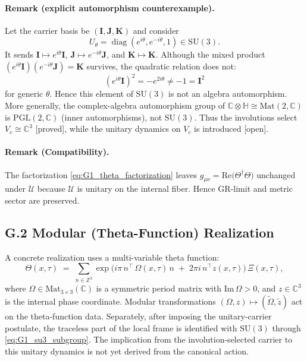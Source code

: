 \paragraph{Remark (explicit automorphism counterexample).}
Let the carrier basis be $(\mathbf{I},\mathbf{J},\mathbf{K})$ and consider
\[
U_\theta=\operatorname{diag}(e^{i\theta},e^{-i\theta},1)\in\mathrm{SU}(3).
\]
It sends $\mathbf{I}\mapsto e^{i\theta}\mathbf{I}$,
$\mathbf{J}\mapsto e^{-i\theta}\mathbf{J}$, and
$\mathbf{K}\mapsto\mathbf{K}$.  Although the mixed product
$(e^{i\theta}\mathbf{I})(e^{-i\theta}\mathbf{J})=\mathbf{K}$ survives,
the quadratic relation does not:
\[
(e^{i\theta}\mathbf{I})^2=-e^{2i\theta}\neq-1=\mathbf{I}^2
\]
for generic $\theta$.  Hence this element of $\mathrm{SU}(3)$ is not an
algebra automorphism.  More generally, the complex-algebra automorphism group
of $\mathbb{C}\otimes\mathbb{H}\cong\mathrm{Mat}(2,\mathbb{C})$ is
$\mathrm{PGL}(2,\mathbb{C})$ (inner automorphisms), not $\mathrm{SU}(3)$.
Thus the involutions select $V_c\cong\mathbb{C}^3$ [proved], while the unitary
dynamics on $V_c$ is introduced [open].

\paragraph{Remark (Compatibility).}
The factorization \eqref{eq:G1_theta_factorization} leaves 
$g_{\mu\nu}=\mathrm{Re}\big(\Theta^\dagger \Theta\big)$ unchanged under $\mathcal{U}$ because $\mathcal{U}$ is unitary on the internal fiber. Hence GR-limit and metric sector are preserved.

\subsection*{G.2 Modular (Theta-Function) Realization}
A concrete realization uses a multi-variable theta function:
\begin{equation}
\label{eq:G2_multi_theta}
\Theta(x,\tau)\;=\;\sum_{n\in \mathbb{Z}^3}\exp\Big(i\pi\, n^{\!\top}\,\Omega(x,\tau)\,n \;+\; 2\pi i\, n^{\!\top} z(x,\tau)\Big)\, \Xi(x,\tau),
\end{equation}
where $\Omega\in \mathrm{Mat}_{3\times 3}(\mathbb{C})$ is a symmetric period matrix with 
$\mathrm{Im}\,\Omega>0$, and $z\in \mathbb{C}^3$ is the internal phase coordinate. 
Modular transformations $(\Omega,z)\mapsto (\tilde\Omega,\tilde z)$ act on the theta-function data.  Separately, after imposing the unitary-carrier postulate, the traceless part of the local frame is identified with $\mathrm{SU}(3)$ through \eqref{eq:G1_su3_subgroup}.  The implication from the involution-selected carrier to this unitary dynamics is not yet derived from the canonical action.

